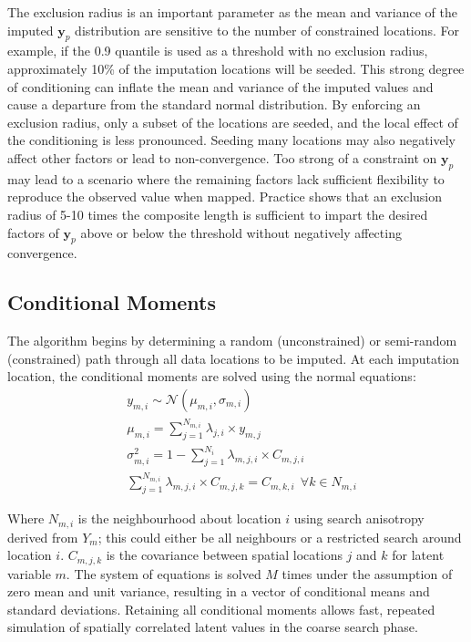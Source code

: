 The exclusion radius is an important parameter as the mean and variance of the imputed $\mathbf{y}_{p}$ distribution are sensitive to the number of constrained locations. For example, if the 0.9 quantile is used as a threshold with no exclusion radius, approximately 10\% of the imputation locations will be seeded. This strong degree of conditioning can inflate the mean and variance of the imputed values and cause a departure from the standard normal distribution. By enforcing an exclusion radius, only a subset of the locations are seeded, and the local effect of the conditioning is less pronounced. Seeding many locations may also negatively affect other factors or lead to non-convergence. Too strong of a constraint on $\mathbf{y}_{p}$ may lead to a scenario where the remaining factors lack sufficient flexibility to reproduce the observed value when mapped. Practice shows that an exclusion radius of 5-10 times the composite length is sufficient to impart the desired factors of $\mathbf{y}_{p}$ above or below the threshold without negatively affecting convergence.

\subsection{Conditional Moments}
\label{subsec:05condmom}

The algorithm begins by determining a random (unconstrained) or semi-random (constrained) path through all data locations to be imputed. At each imputation location, the conditional moments are solved using the normal equations:
\begin{align}
     & y_{m,i} \sim {\mathcal {N}}\left( \mu_{m,i}, \sigma_{m,i} \right)                           \\
     & \mu_{m,i} = \sum_{j=1}^{N_{m,i}} \lambda_{j,i} \times y_{m,j}                               \\
     & \sigma_{m,i}^{2} = 1 - \sum_{j=1}^{N_{i}} \lambda_{m,j,i} \times C_{m,j,i}                  \\
     & \sum_{j=1}^{N_{m,i}} \lambda_{m,j,i} \times C_{m,j,k} = C_{m,k,i} \ \ \forall k \in N_{m,i}
\end{align}

Where $N_{m,i}$ is the neighbourhood about location $i$ using search anisotropy derived from $Y_{m}$; this could either be all neighbours or a restricted search around location $i$. $C_{m,j,k}$ is the covariance between spatial locations $j$ and $k$ for latent variable $m$. The system of equations is solved $M$ times under the assumption of zero mean and unit variance, resulting in a vector of conditional means and standard deviations. Retaining all conditional moments allows fast, repeated simulation of spatially correlated latent values in the coarse search phase.


